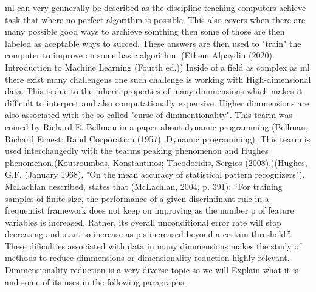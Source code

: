 \gls{ml} can very gennerally be described as the discipline teaching computers achieve task that where no perfect algorithm is possible. This also covers when there are many possible good ways to archieve somthing then some of those are then labeled as aceptable ways to succed. These answers are then used to "train" the computer to improve on some basic algorithm. (Ethem Alpaydin (2020). Introduction to Machine Learning (Fourth ed.)) Inside of a field as complex as \gls{ml} there exist many challengens one such challenge is working with High-dimensional data. This is due to the inherit properties of many dimmensions which makes it difficult to interpret and also computationally expensive. Higher dimmensions are also associated with the so called "curse of dimmentionality". This tearm was coined by Richard E. Bellman in a paper about dynamic programming (Bellman, Richard Ernest; Rand Corporation (1957). Dynamic programming). This tearm is used interchangedly with the tearms peaking phenomenon and Hughes phenomenon.(Koutroumbas, Konstantinos; Theodoridis, Sergios (2008).)(Hughes, G.F. (January 1968). "On the mean accuracy of statistical pattern recognizers"). McLachlan described, states that (McLachlan, 2004, p. 391): 
“For training samples of ﬁnite size, the performance of a given discriminant
rule in a frequentist framework does not keep on improving as the number p
of feature variables is increased. Rather, its overall unconditional error rate
will stop decreasing and start to increase as pis increased beyond a certain
threshold.”.
These dificulties associated with data in many dimmensions makes the study of methods to reduce dimmensions or dimensionality reduction highly relevant. Dimmensionality reduction is a very diverse topic so we will Explain what it is and some of its uses in the following paragraphs.





